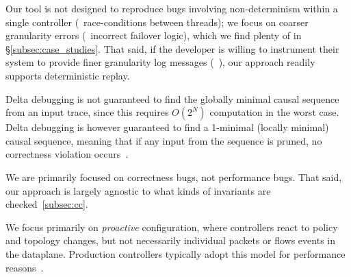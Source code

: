  Our tool is not designed to reproduce bugs
involving non-determinism within a single controller (\eg~race-conditions between threads);
we focus on coarser granularity errors (\eg~incorrect failover logic), which we find plenty of
in \S\ref{subsec:case_studies}.
That said, if the developer is willing to instrument their system to
provide finer granularity log messages (\cf~\cite{Geels:2006:RDD:1267359.1267386}),
our approach readily supports deterministic replay.

Delta debugging is not guaranteed to find the globally minimal
causal sequence from an input trace, since this requires $O(2^N)$ computation in the worst case.
Delta debugging is however guaranteed to find a 1-minimal (locally minimal) causal sequence,
meaning that if any input from the sequence is pruned, no correctness violation
occurs~\cite{Zeller:2002:SIF:506201.506206}. 

We are primarily focused on correctness bugs, not performance bugs. That said,
our approach is largely agnostic to what kinds of invariants are
checked~\ref{subsec:cc}.

 We focus primarily on
\emph{proactive} configuration, where controllers react to policy and topology changes, but
 not necessarily individual packets or flows events in the dataplane.
Production controllers typically adopt this model for performance reasons~\cite{nicira}.




